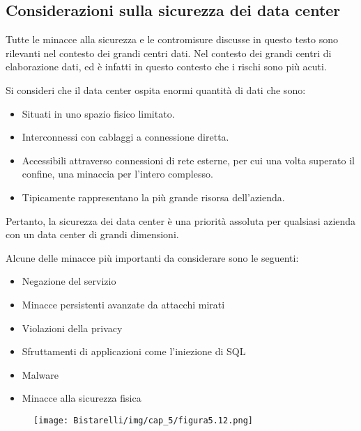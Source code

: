 \subsection{Considerazioni sulla sicurezza dei data center}
Tutte le minacce alla sicurezza e le contromisure discusse in questo testo sono rilevanti nel contesto dei grandi centri dati. Nel contesto dei grandi centri di elaborazione dati, ed è infatti in questo contesto che i rischi
sono più acuti.

\singlespacing

Si consideri che il data center ospita enormi quantità di dati che sono:

\begin{itemize}
    \item Situati in uno spazio fisico limitato.
    
    \item Interconnessi con cablaggi a connessione diretta.
    
    \item Accessibili attraverso connessioni di rete esterne, per cui una volta superato il confine, una  minaccia per l'intero complesso.
    
    \item Tipicamente rappresentano la più grande risorsa dell'azienda.
\end{itemize}
Pertanto, la sicurezza dei data center è una priorità assoluta per qualsiasi azienda con un data center di grandi dimensioni.

\singlespacing

Alcune delle minacce più importanti da considerare sono le seguenti:
\begin{itemize}
    \item Negazione del servizio
    
    \item Minacce persistenti avanzate da attacchi mirati
    
    \item Violazioni della privacy
    
    \item Sfruttamenti di applicazioni come l'iniezione di SQL
    
    \item Malware
    
    \item Minacce alla sicurezza fisica
\end{itemize}

\begin{figure}[H]
	\centering
    \texttt{[image: Bistarelli/img/cap\_5/figura5.12.png]}
\end{figure}

